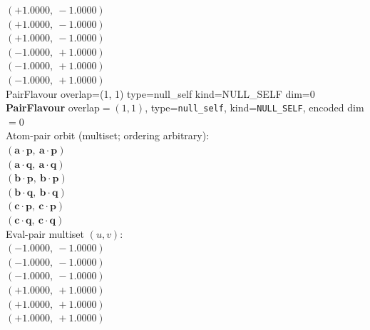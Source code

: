 \documentclass[a4paper,11pt]{article}
\newcommand{\pdcegfomjfhook}[2]{\mathbf{#1} \cdot \mathbf{#2}}
\begin{document}
$(+1.0000,\ -1.0000)$\\
$(+1.0000,\ -1.0000)$\\
$(+1.0000,\ -1.0000)$\\
$(-1.0000,\ +1.0000)$\\
$(-1.0000,\ +1.0000)$\\
$(-1.0000,\ +1.0000)$\\
    PairFlavour  overlap=(1, 1)  type=null\_self  kind=NULL\_SELF  dim=0
\textbf{PairFlavour} overlap$=(1, 1)$, type=\texttt{null\_self}, kind=\texttt{NULL\_SELF}, encoded dim$=0$\\
\quad Atom-pair orbit (multiset; ordering arbitrary):\\
$(\pdcegfomjfhook{a}{p},\ \pdcegfomjfhook{a}{p})$\\
$(\pdcegfomjfhook{a}{q},\ \pdcegfomjfhook{a}{q})$\\
$(\pdcegfomjfhook{b}{p},\ \pdcegfomjfhook{b}{p})$\\
$(\pdcegfomjfhook{b}{q},\ \pdcegfomjfhook{b}{q})$\\
$(\pdcegfomjfhook{c}{p},\ \pdcegfomjfhook{c}{p})$\\
$(\pdcegfomjfhook{c}{q},\ \pdcegfomjfhook{c}{q})$\\
\quad Eval-pair multiset $(u, v)$:\\
$(-1.0000,\ -1.0000)$\\
$(-1.0000,\ -1.0000)$\\
$(-1.0000,\ -1.0000)$\\
$(+1.0000,\ +1.0000)$\\
$(+1.0000,\ +1.0000)$\\
$(+1.0000,\ +1.0000)$\\
\end{document}
